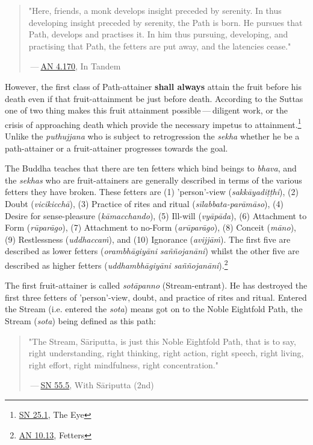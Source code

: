 \begin{quotation}
"Here, friends, a
monk develops insight preceded by serenity. In thus developing insight
preceded by serenity, the Path is born. He pursues that Path, develops
and practises it. In him thus pursuing, developing, and practising that
Path, the fetters are put away, and the latencies
cease."


 — \href{https://suttacentral.net/an4.170/en/thanissaro}{AN 4.170}, In Tandem


\end{quotation}

However, the first class of Path-attainer \textbf{shall always} attain the
fruit before his death even if that fruit-attainment be just before
death. According to the Suttas one of two thing makes this fruit
attainment possible — diligent work, or the crisis of approaching death
which provide the necessary impetus to attainment.\footnote{\href{https://suttacentral.net/sn25.1/en/sujato}{SN 25.1}, The Eye}
Unlike the \emph{puthujjana} who is subject to retrogression the \emph{sekha} whether he be a
path-attainer or a fruit-attainer progresses towards the goal.


The Buddha teaches that there are ten fetters which bind beings to
\emph{bhava}, and the \emph{sekhas} who are fruit-attainers are generally
described in terms of the various fetters they have broken. These
fetters are (1) 'person'-view (\emph{sakkāyadiṭṭhi}), (2) Doubt
(\emph{vicikicchā}), (3) Practice of rites and ritual
(\emph{sīlabbata-parāmāso}), (4) Desire for sense-pleasure
(\emph{kāmacchando}), (5) Ill-will (\emph{vyāpāda}), (6) Attachment to Form
(\emph{rūparāgo}), (7) Attachment to no-Form (\emph{arūparāgo}), (8) Conceit
(\emph{māno}), (9) Restlessness (\emph{uddhaccaṁ}), and (10) Ignorance
(\emph{avijjāṁ}). The first five are described as lower fetters
(\emph{orambhāgiyāni saññojanāni}) whilst the other five are described as
higher fetters (\emph{uddhambhāgiyāni saññojanāni}).\footnote{\href{https://suttacentral.net/an10.13/en/bodhi}{AN 10.13}, Fetters}


The first fruit-attainer is called \emph{sotāpanno} (Stream-entrant). He has
destroyed the first three fetters of 'person'-view, doubt, and practice
of rites and ritual. Entered the Stream (i.e. entered the \emph{sota})
means got on to the Noble Eightfold Path, the Stream (\emph{sota}) being
defined as this path:


\begin{quotation}
"The Stream, Sāriputta, is just this Noble
Eightfold Path, that is to say, right understanding, right thinking,
right action, right speech, right living, right effort, right
mindfulness, right concentration."


 — \href{https://suttacentral.net/sn55.5/en/sujato}{SN 55.5}, With Sāriputta (2nd)


\end{quotation}

